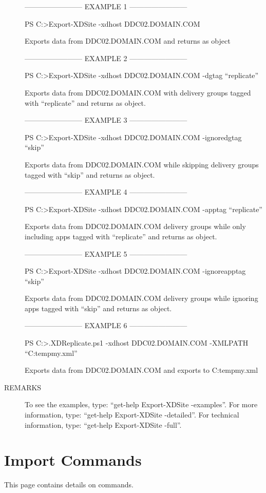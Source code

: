 \documentclass[letterpaper,10pt,english]{sphinxmanual}
\begin{document}
\begin{description}
\begin{description}
\end{description}

————————\textendash{} EXAMPLE 1 ————————\textendash{}

PS C:\textgreater{}Export-XDSite -xdhost DDC02.DOMAIN.COM

Exports data from DDC02.DOMAIN.COM and returns as object

————————\textendash{} EXAMPLE 2 ————————\textendash{}

PS C:\textgreater{}Export-XDSite -xdhost DDC02.DOMAIN.COM -dgtag “replicate”

Exports data from DDC02.DOMAIN.COM with delivery groups tagged with “replicate” and returns as object.

————————\textendash{} EXAMPLE 3 ————————\textendash{}

PS C:\textgreater{}Export-XDSite -xdhost DDC02.DOMAIN.COM -ignoredgtag “skip”

Exports data from DDC02.DOMAIN.COM while skipping delivery groups tagged with “skip” and returns as object.

————————\textendash{} EXAMPLE 4 ————————\textendash{}

PS C:\textgreater{}Export-XDSite -xdhost DDC02.DOMAIN.COM -apptag “replicate”

Exports data from DDC02.DOMAIN.COM delivery groups while only including apps tagged with “replicate” and returns as object.

————————\textendash{} EXAMPLE 5 ————————\textendash{}

PS C:\textgreater{}Export-XDSite -xdhost DDC02.DOMAIN.COM -ignoreapptag “skip”

Exports data from DDC02.DOMAIN.COM delivery groups while ignoring apps tagged with “skip” and returns as object.

————————\textendash{} EXAMPLE 6 ————————\textendash{}

PS C:\textgreater{}.XDReplicate.ps1 -xdhost DDC02.DOMAIN.COM -XMLPATH “C:tempmy.xml”

Exports data from DDC02.DOMAIN.COM and exports to C:tempmy.xml

\item[{REMARKS}] \leavevmode
To see the examples, type: “get-help Export-XDSite -examples”.
For more information, type: “get-help Export-XDSite -detailed”.
For technical information, type: “get-help Export-XDSite -full”.

\end{description}


\chapter{Import Commands}
\label{\detokenize{cmd_import:import-commands}}\label{\detokenize{cmd_import::doc}}
This page contains details on  commands.
\end{document}
